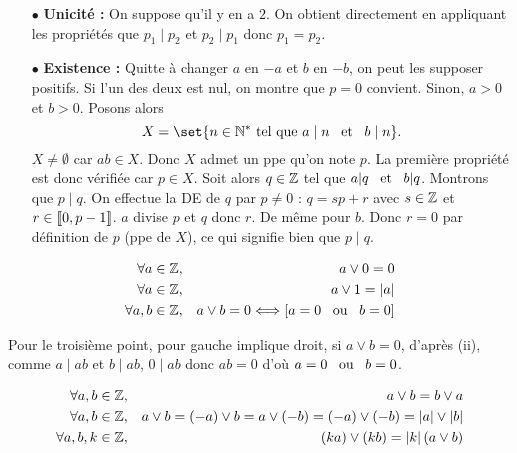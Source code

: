 \documentclass{magnolia}
\begin{document}
\begin{preuve}
\begin{itemize}
\item[$\bullet$] \textbf{Unicité :} On suppose qu'il y en a $2$. On obtient directement en appliquant les propriétés que $p_1\mid p_2$ et $p_2\mid p_1$ donc $p_1=p_2$.
\item[$\bullet$] \textbf{Existence :} Quitte à changer $a$ en $-a$ et $b$ en $-b$, on peut les supposer positifs. Si l'un des deux est nul, on montre que $p=0$ convient. Sinon, $a>0$ et $b>0$. Posons alors $$X=\set{n\in \Ns \text{ tel que } a\mid n \et b\mid n}.$$
$X\neq \emptyset$ car $ab\in X$. Donc $X$ admet un ppe qu'on note $p$. La première propriété est donc vérifiée car $p\in X$. Soit alors $q\in \mathbb{Z}$ tel que $a|q \quad\!\text{et}\quad\! b|q$. Montrons que $p\mid q$. On effectue la DE de $q$ par $p\neq 0$ : $q=sp+r$ avec $s\in \mathbb{Z}$ et $r\in \left\llbracket 0,p-1\right\rrbracket$. $a$ divise $p$ et $q$ donc $r$. De même pour $b$. Donc $r=0$ par définition de $p$ (ppe de $X$), ce qui signifie bien que $p\mid q$.
\end{itemize}

\end{preuve}

\begin{proposition}
\begin{eqnarray*}
\forall a\in\mathbb{Z}, & & a\vee 0=0\\
\forall a\in\mathbb{Z}, & & a\vee 1=\left|a\right|\\
\forall a,b\in\mathbb{Z}, & & a\vee b=0 \Longleftrightarrow \left[a=0 \quad\!\text{ou}\quad\! b=0\right]
\end{eqnarray*}
\end{proposition}

\begin{preuve}
Pour le troisième point, pour gauche implique droit, si $a\vee b=0$, d'après (ii), comme $a\mid ab$ et $b\mid ab$, $0\mid ab$ donc $ab=0$ d'où $a=0 \quad\!\text{ou}\quad\! b=0$.
\end{preuve}

\begin{proposition}
\begin{eqnarray*}
\forall a,b\in\mathbb{Z}, & & a\vee b=b\vee a\\
\forall a,b\in\mathbb{Z}, & &a\vee b=\left(-a\right)\vee b=a\vee\left(-b\right)=
  \left(-a\right)\vee\left(-b\right)=\left|a\right|\vee\left|b\right|\\
\forall a,b,k\in\mathbb{Z}, & & \left(ka\right)\vee\left(kb\right)=\left|k\right|\left(a\vee b\right)
\end{eqnarray*}
\end{proposition}
\end{document}

